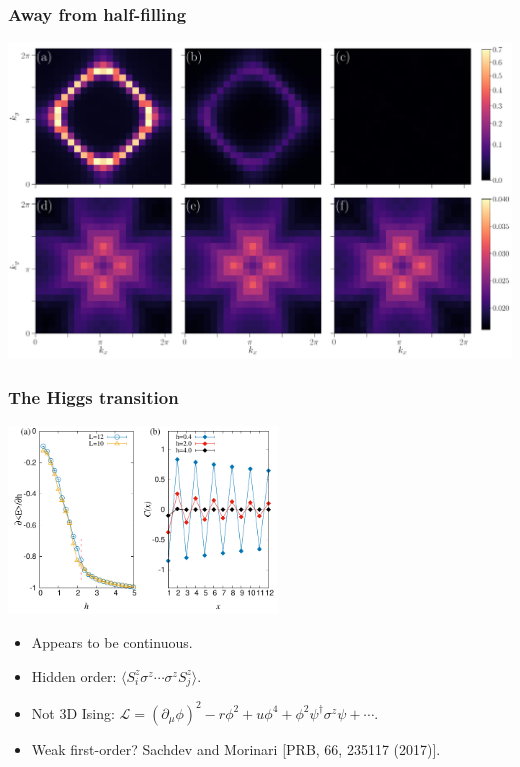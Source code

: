 \documentclass[xcolor=table, 10pt, aspectratio=43]{beamer}
\begin{document}
\begin{frame}
\frametitle{Away from half-filling}
\begin{center}
	\includegraphics[width=\textwidth]{../orthogonal_metal/figS1}
\end{center}
\end{frame}

\begin{frame}
\frametitle{The Higgs transition}
\begin{center}
	\includegraphics[height=5cm]{../orthogonal_metal/fig3}
\end{center}
\begin{itemize}
	\item Appears to be continuous.
	\item Hidden order: $\langle S_i^z\sigma^z\cdots\sigma^zS_j^z\rangle$.
	\item Not 3D Ising:
	$\mathcal L = (\partial_\mu\phi)^2-r\phi^2+u\phi^4+\phi^2\psi^\dagger\sigma^z\psi+\cdots$.
	\item Weak first-order? Sachdev and Morinari [PRB, 66, 235117 (2017)].
\end{itemize}
\end{frame}
\end{document}
